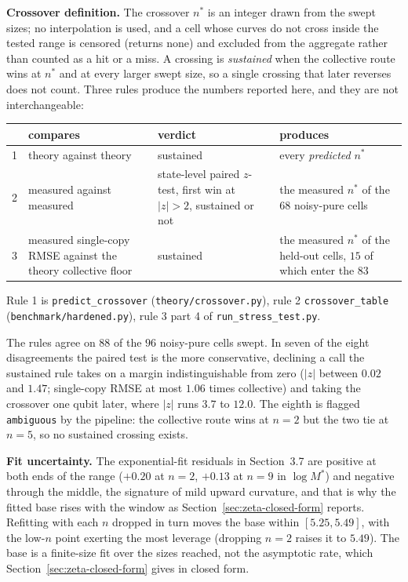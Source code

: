 \documentclass[a4paper,superscriptaddress,nofootinbib,onecolumn,nopdfoutputerror]{quantumarticle}
\begin{document}
\textbf{Crossover definition.} The crossover \(n^*\) is an integer drawn from the swept sizes;
no interpolation is used, and a cell whose curves do not cross inside the tested range is censored
(returns none) and excluded from the aggregate rather than counted as a hit or a miss. A crossing
is \emph{sustained} when the collective route wins at \(n^*\) and at every larger swept size,
so a single crossing that later reverses does not count. Three rules
produce the numbers reported here, and they are not interchangeable:

\begin{center}\footnotesize
\begin{tabular}{@{}l@{\ \ }p{}p{}p{}@{}}
\hline
 & compares & verdict & produces \\
\hline
1 & theory against theory & sustained & every \emph{predicted} \(n^*\) \\[3pt]
2 & measured against measured & state-level paired \(z\)-test, first win at
    \(|z| > 2\), sustained or not
  & the measured \(n^*\) of the \(68\) noisy-pure cells \\[3pt]
3 & measured single-copy RMSE against the theory collective floor & sustained
  & the measured \(n^*\) of the held-out cells, \(15\) of which enter the
    \(83\) \\
\hline
\end{tabular}
\end{center}

\begin{sloppypar}
\noindent Rule 1 is \texttt{predict\_\allowbreak crossover}
(\texttt{theory/\allowbreak crossover.py}), rule 2
\texttt{crossover\_\allowbreak table}
(\texttt{benchmark/\allowbreak hardened.py}), rule 3 part 4 of
\texttt{run\_\allowbreak stress\_\allowbreak test.py}.
\end{sloppypar}

The rules agree on \(88\) of the \(96\) noisy-pure cells swept. In seven of
the eight disagreements the paired test is the more conservative,
declining a call the sustained rule takes on a margin indistinguishable
from zero (\(|z|\) between \(0.02\) and \(1.47\); single-copy RMSE at most
\(1.06\) times collective) and taking the crossover one qubit later, where
\(|z|\) runs \(3.7\) to \(12.0\). The eighth is flagged
\texttt{ambiguous} by the pipeline: the collective route wins at
\(n = 2\) but the two tie at \(n = 5\), so no sustained crossing
exists.

\textbf{Fit uncertainty.} The exponential-fit residuals in Section~3.7 are
positive at both ends of the range (\(+0.20\) at \(n = 2\), \(+0.13\) at
\(n = 9\) in \(\log M^*\)) and negative through the middle, the signature of
mild upward curvature, and that is why the fitted base rises with the window as
Section~\ref{sec:zeta-closed-form} reports. Refitting with each \(n\) dropped
in turn moves the base within \([5.25, 5.49]\), with the low-\(n\) point
exerting the most leverage (dropping \(n = 2\) raises it to \(5.49\)). The
base is a finite-size fit over the sizes reached, not the asymptotic rate, which
Section~\ref{sec:zeta-closed-form} gives in closed form.
\end{document}

